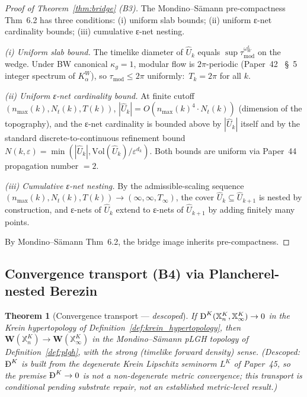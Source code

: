 \documentclass[11pt,a4paper]{article}
\theoremstyle{plain}
\newtheorem{theorem}{Theorem}[section]
\theoremstyle{definition}
\newcommand{\nmax}{n_{\max}}
\newcommand{\Nt}{N_{t}}
\newcommand{\BigDeth}{\text{\DJ}^{K}}
\newcommand{\Wfun}{\mathbf{W}}
\newcommand{\BWvac}{\omega_{W}^{L}}
\newcommand{\Kalpha}{K_{\alpha}^{W}}
\newcommand{\tmod}{\tau_{\mathrm{mod}}}
\newcommand{\kappag}{\kappa_{g}}
\begin{document}
\begin{proof}[Proof of Theorem~\ref{thm:bridge} (B3)]
The Mondino--S\"amann pre-compactness Thm~6.2 has three conditions:
(i) uniform slab bounds; (ii) uniform ε-net cardinality bounds;
(iii) cumulative ε-net nesting.

\emph{(i) Uniform slab bound.} The timelike diameter of $\hat{U}_{k}$
equals $\sup \tmod^{\BWvac}$ on the wedge. Under BW canonical
$\kappag = 1$, modular flow is $2\pi$-periodic (Paper~42~\cite{paper42}
\S~5 integer spectrum of $\Kalpha$), so $\tmod \le 2\pi$ uniformly:\
$T_{k} = 2\pi$ for all $k$.

\emph{(ii) Uniform ε-net cardinality bound.} At finite cutoff
$(\nmax(k), \Nt(k), T(k))$, $|\hat{U}_{k}| = O(\nmax(k)^{4} \cdot \Nt(k))$
(dimension of the topography), and the ε-net cardinality is bounded
above by $|\hat{U}_{k}|$ itself and by the standard discrete-to-continuous
refinement bound $N(k, \varepsilon) = \min(|\hat{U}_{k}|,
\mathrm{Vol}(\hat{U}_{k})/\varepsilon^{d_{k}})$. Both bounds are
uniform via Paper~44~\cite{paper44} propagation number $= 2$.

\emph{(iii) Cumulative ε-net nesting.} By the admissible-scaling
sequence $(\nmax(k), \Nt(k), T(k)) \to (\infty, \infty, T_{\infty})$,
the cover $\hat{U}_{k} \subseteq \hat{U}_{k+1}$ is nested by
construction, and ε-nets of $\hat{U}_{k}$ extend to ε-nets of
$\hat{U}_{k+1}$ by adding finitely many points.

By Mondino--S\"amann Thm~6.2, the bridge image inherits
pre-compactness.
\end{proof}

\subsection{Convergence transport (B4) via Plancherel-nested
Berezin}\label{sec:b4_convergence}

\begin{theorem}[Convergence transport --- \emph{descoped}]\label{thm:convergence_transport}
If $\BigDeth(\mathbb{X}^{K}_{n}, \mathbb{X}^{K}_{\infty}) \to 0$ in
the Krein hypertopology of Definition~\ref{def:krein_hypertopology},
then $\Wfun(\mathbb{X}^{K}_{n}) \to \Wfun(\mathbb{X}^{K}_{\infty})$
in the Mondino--S\"amann pLGH topology of
Definition~\ref{def:plgh}, with the strong (timelike forward density)
sense. \emph{(Descoped:} $\BigDeth$ is built from the degenerate Krein
Lipschitz seminorm $L^{K}$ of Paper~45, so the premise $\BigDeth\to0$ is
not a non-degenerate metric convergence; this transport is conditional
pending substrate repair, not an established metric-level result.\emph{)}
\end{theorem}
\end{document}
